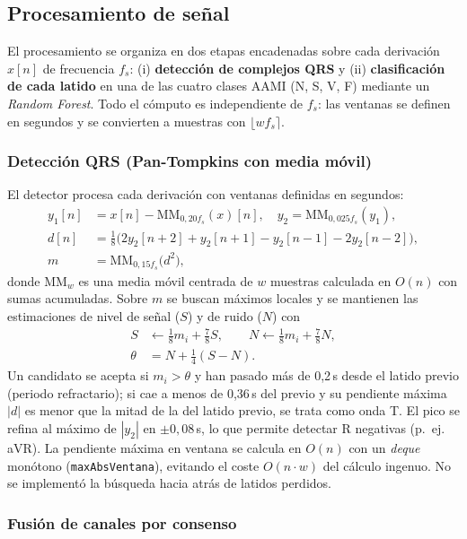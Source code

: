 \subsection{Procesamiento de señal}

El procesamiento se organiza en dos etapas encadenadas sobre cada derivación $x[n]$ de frecuencia $f_s$: (i) \textbf{detección de complejos QRS} y (ii) \textbf{clasificación de cada latido} en una de las cuatro clases AAMI (N, S, V, F) mediante un \emph{Random Forest}. Todo el cómputo es independiente de $f_s$: las ventanas se definen en segundos y se convierten a muestras con $\lfloor w f_s \rceil$.

\subsubsection{Detección QRS (Pan-Tompkins con media móvil)}

El detector procesa cada derivación con ventanas definidas en segundos:
\begin{align}
y_1[n]&=x[n]-\mathrm{MM}_{0{,}20 f_s}(x)[n],\quad y_2=\mathrm{MM}_{0{,}025 f_s}(y_1),\\
d[n]&=\tfrac{1}{8}\bigl(2y_2[n{+}2]+y_2[n{+}1]-y_2[n{-}1]-2y_2[n{-}2]\bigr),\\
m&=\mathrm{MM}_{0{,}15 f_s}\!\bigl(d^{2}\bigr),
\end{align}
donde $\mathrm{MM}_w$ es una media móvil centrada de $w$ muestras calculada en $O(n)$ con sumas acumuladas. Sobre $m$ se buscan máximos locales y se mantienen las estimaciones de nivel de señal ($S$) y de ruido ($N$) con
\begin{align}
S&\leftarrow \tfrac18 m_i+\tfrac78 S,\qquad N\leftarrow \tfrac18 m_i+\tfrac78 N,\\
\theta&=N+\tfrac14(S-N).
\end{align}
Un candidato se acepta si $m_i>\theta$ y han pasado más de 0,2\,s desde el latido previo (periodo refractario); si cae a menos de 0,36\,s del previo y su pendiente máxima $|d|$ es menor que la mitad de la del latido previo, se trata como onda T. El pico se refina al máximo de $|y_2|$ en $\pm 0{,}08$\,s, lo que permite detectar R negativas (p.~ej. aVR). La pendiente máxima en ventana se calcula en $O(n)$ con un \emph{deque} monótono (\texttt{maxAbsVentana}), evitando el coste $O(n\cdot w)$ del cálculo ingenuo. No se implementó la búsqueda hacia atrás de latidos perdidos.

\subsubsection{Fusión de canales por consenso}

